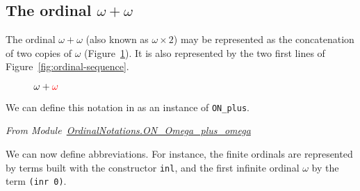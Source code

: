 
\subsection{The ordinal \texorpdfstring{$\omega+\omega$}{omega + omega}}

The ordinal $\omega+\omega$ (also known as $\omega\times 2$) may be represented as the concatenation 
of two copies of $\omega$ (Figure~\ref{fig:omega-plus-omega}).
It is also represented by the two first lines of Figure~\ref{fig:ordinal-sequence}.

\begin{figure}[h]
   \centering
   \caption{\textcolor{blue}{$\omega+{\color{red}\omega}$}}
   \label{fig:omega-plus-omega}
 \end{figure}

We can define this notation in \coq{} as an instance of \texttt{ON\_plus}.


\vspace{4pt}
\noindent\emph{From Module~\href{../theories/html/hydras.OrdinalNotations.ON_Omega_plus_omega.html}{OrdinalNotations.ON\_Omega\_plus\_omega}}



\vspace{4pt}

We can now define abbreviations. For instance, the finite ordinals are represented by terms built with  the constructor \texttt{inl}, and the first infinite ordinal $\omega$ by the term \texttt{(inr 0)}.

